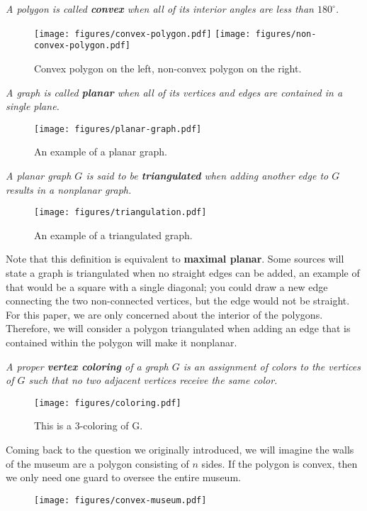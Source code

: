 \documentclass[10pt]{amsart}
\begin{document}
 \emph{A polygon is called \textbf{convex} when all of its interior angles 
are less than $180^\circ$.}
\begin{figure}[h!]
    \centering
    \texttt{[image: figures/convex-polygon.pdf]}
    \texttt{[image: figures/non-convex-polygon.pdf]}
    \caption{Convex polygon on the left, non-convex polygon on the right.}
\end{figure}

 \emph{A graph is called \textbf{planar} when all of its vertices and edges 
are contained in a single plane.}
\begin{figure}[h!]
    \centering
    \texttt{[image: figures/planar-graph.pdf]}
    \caption{An example of a planar graph.}
\end{figure}

\pagebreak

 \emph{A planar graph $G$ is said to be \textbf{triangulated} when adding 
another edge to $G$ results in a nonplanar graph.}
\begin{figure}[h!]
    \centering
    \texttt{[image: figures/triangulation.pdf]}
    \caption{An example of a triangulated graph.}
\end{figure}

Note that this definition is equivalent to \textbf{maximal planar}. Some sources will 
state a graph is triangulated when no straight edges can be added, an example of that would be a 
square with a single diagonal; you could draw a new edge connecting the two non-connected 
vertices, but the edge would not be straight. For this paper, we are only concerned about the 
interior of the polygons. Therefore, we will consider a polygon triangulated when adding 
an edge that is contained within the polygon will make it nonplanar.

 \emph{ A proper \textbf{vertex coloring} of a graph $G$ is an assignment of 
colors to the vertices of $G$ such that no two adjacent vertices receive the same color.}
\begin{figure}[h!]
    \centering
    \texttt{[image: figures/coloring.pdf]}
    \caption{This is a 3-coloring of G.}
\end{figure}



Coming back to the question we originally introduced, we will imagine the walls of the museum are a polygon consisting of $n$ sides. 
If the polygon is convex, then we only need one guard to oversee the entire museum. 
\begin{figure}[h!]
    \centering
    \texttt{[image: figures/convex-museum.pdf]}
\end{figure}
\end{document}
